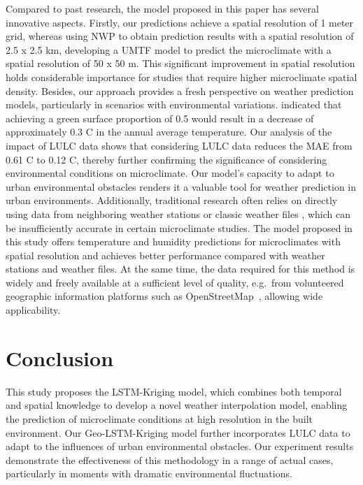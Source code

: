 \documentclass[a4paper,fleqn]{cas-sc}
\begin{document}
Compared to past research, the model proposed in this paper has several innovative aspects. Firstly, our predictions achieve a spatial resolution of 1 meter grid, whereas \cite{di2020mean} using NWP to obtain prediction results with a spatial resolution of 2.5 x 2.5 km, \cite{chang2021development} developing a UMTF model to predict the microclimate with a spatial resolution of 50 x 50 m. This significant improvement in spatial resolution holds considerable importance for studies that require higher microclimate spatial density. Besides, our approach provides a fresh perspective on weather prediction models, particularly in scenarios with environmental variations. \cite{erell2022effect} indicated that achieving a green surface proportion of 0.5 would result in a decrease of approximately 0.3 \textdegree C in the annual average temperature. Our analysis of the impact of LULC data shows that considering LULC data reduces the MAE from 0.61 \textdegree C to 0.12 \textdegree C, thereby further confirming the significance of considering environmental conditions on microclimate. Our model's capacity to adapt to urban environmental obstacles renders it a valuable tool for weather prediction in urban environments. Additionally, traditional research often relies on directly using data from neighboring weather stations or classic weather files \citep{kruger2013assessment,kruger2017identifying,li2020perception}, which can be insufficiently accurate in certain microclimate studies. The model proposed in this study offers temperature and humidity predictions for microclimates with spatial resolution and achieves better performance compared with weather stations and weather files. At the same time, the data required for this method is widely and freely available at a sufficient level of quality, e.g.\ from volunteered geographic information platforms such as OpenStreetMap~\citep{2023_bae_osm_qa,Herfort.2023}, allowing wide applicability.




\section{Conclusion}\label{Conclusion}

This study proposes the LSTM-Kriging model, which combines both temporal and spatial knowledge to develop a novel weather interpolation model, enabling the prediction of microclimate conditions at high resolution in the built environment. Our Geo-LSTM-Kriging model further incorporates LULC data to adapt to the influences of urban environmental obstacles. Our experiment results demonstrate the effectiveness of this methodology in a range of actual cases, particularly in moments with dramatic environmental fluctuations. 
\end{document}
